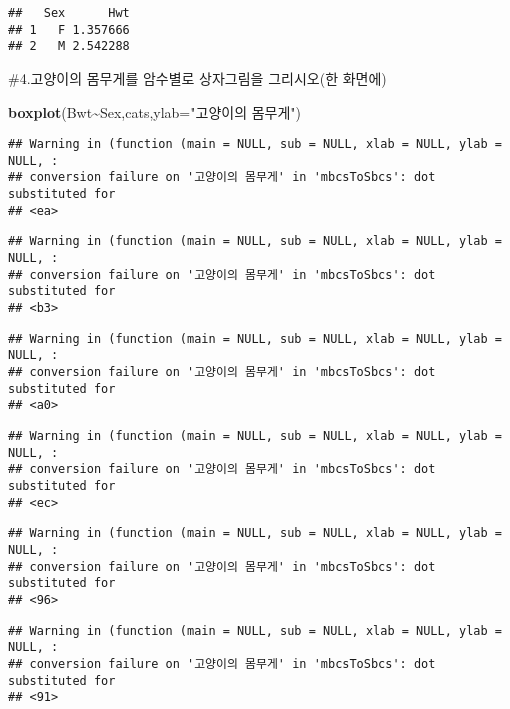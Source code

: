 \documentclass[
]{article}
\newenvironment{Shaded}{\begin{snugshade}}{\end{snugshade}}
\newcommand{\AttributeTok}[1]{\textcolor[rgb]{0.13,0.29,0.53}{#1}}
\newcommand{\FunctionTok}[1]{\textcolor[rgb]{0.13,0.29,0.53}{\textbf{#1}}}
\newcommand{\NormalTok}[1]{#1}
\newcommand{\SpecialCharTok}[1]{\textcolor[rgb]{0.81,0.36,0.00}{\textbf{#1}}}
\newcommand{\StringTok}[1]{\textcolor[rgb]{0.31,0.60,0.02}{#1}}
\begin{document}
\begin{verbatim}
##   Sex      Hwt
## 1   F 1.357666
## 2   M 2.542288
\end{verbatim}

\#4.고양이의 몸무게를 암수별로 상자그림을 그리시오(한 화면에)

\begin{Shaded}
\begin{Highlighting}[]
\FunctionTok{boxplot}\NormalTok{(Bwt}\SpecialCharTok{\textasciitilde{}}\NormalTok{Sex,cats,}\AttributeTok{ylab=}\StringTok{"고양이의 몸무게"}\NormalTok{)}
\end{Highlighting}
\end{Shaded}

\begin{verbatim}
## Warning in (function (main = NULL, sub = NULL, xlab = NULL, ylab = NULL, :
## conversion failure on '고양이의 몸무게' in 'mbcsToSbcs': dot substituted for
## <ea>
\end{verbatim}

\begin{verbatim}
## Warning in (function (main = NULL, sub = NULL, xlab = NULL, ylab = NULL, :
## conversion failure on '고양이의 몸무게' in 'mbcsToSbcs': dot substituted for
## <b3>
\end{verbatim}

\begin{verbatim}
## Warning in (function (main = NULL, sub = NULL, xlab = NULL, ylab = NULL, :
## conversion failure on '고양이의 몸무게' in 'mbcsToSbcs': dot substituted for
## <a0>
\end{verbatim}

\begin{verbatim}
## Warning in (function (main = NULL, sub = NULL, xlab = NULL, ylab = NULL, :
## conversion failure on '고양이의 몸무게' in 'mbcsToSbcs': dot substituted for
## <ec>
\end{verbatim}

\begin{verbatim}
## Warning in (function (main = NULL, sub = NULL, xlab = NULL, ylab = NULL, :
## conversion failure on '고양이의 몸무게' in 'mbcsToSbcs': dot substituted for
## <96>
\end{verbatim}

\begin{verbatim}
## Warning in (function (main = NULL, sub = NULL, xlab = NULL, ylab = NULL, :
## conversion failure on '고양이의 몸무게' in 'mbcsToSbcs': dot substituted for
## <91>
\end{verbatim}
\end{document}
